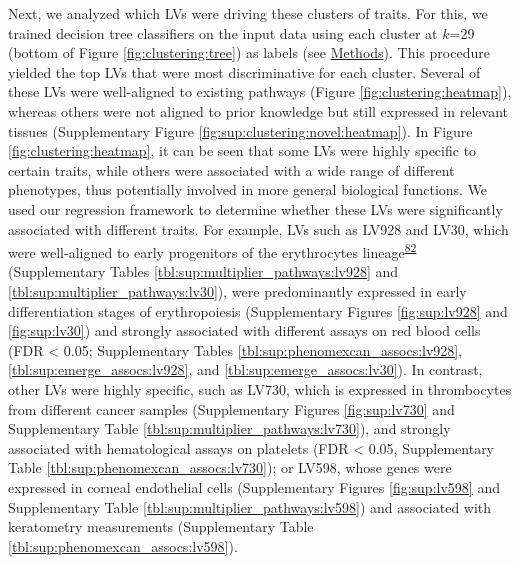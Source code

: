 \documentclass[
  a4paper,
]{article}
\begin{document}
Next, we analyzed which LVs were driving these clusters of traits.
For this, we trained decision tree classifiers on the input data using each cluster at \(k\)=29 (bottom of Figure \ref{fig:clustering:tree}) as labels (see \protect\hyperlink{sec:methods:clustering}{Methods}).
This procedure yielded the top LVs that were most discriminative for each cluster.
Several of these LVs were well-aligned to existing pathways (Figure \ref{fig:clustering:heatmap}), whereas others were not aligned to prior knowledge but still expressed in relevant tissues (Supplementary Figure \ref{fig:sup:clustering:novel:heatmap}).
In Figure \ref{fig:clustering:heatmap}, it can be seen that some LVs were highly specific to certain traits, while others were associated with a wide range of different phenotypes, thus potentially involved in more general biological functions.
We used our regression framework to determine whether these LVs were significantly associated with different traits.
For example, LVs such as LV928 and LV30, which were well-aligned to early progenitors of the erythrocytes lineage\textsuperscript{\protect\hyperlink{ref-Zk82GvJV}{82}} (Supplementary Tables \ref{tbl:sup:multiplier_pathways:lv928} and \ref{tbl:sup:multiplier_pathways:lv30}), were predominantly expressed in early differentiation stages of erythropoiesis (Supplementary Figures \ref{fig:sup:lv928} and \ref{fig:sup:lv30}) and strongly associated with different assays on red blood cells (FDR \textless{} 0.05; Supplementary Tables \ref{tbl:sup:phenomexcan_assocs:lv928}, \ref{tbl:sup:emerge_assocs:lv928}, and \ref{tbl:sup:emerge_assocs:lv30}).
In contrast, other LVs were highly specific, such as LV730, which is expressed in thrombocytes from different cancer samples (Supplementary Figures \ref{fig:sup:lv730} and Supplementary Table \ref{tbl:sup:multiplier_pathways:lv730}), and strongly associated with hematological assays on platelets (FDR \textless{} 0.05, Supplementary Table \ref{tbl:sup:phenomexcan_assocs:lv730});
or LV598, whose genes were expressed in corneal endothelial cells (Supplementary Figures \ref{fig:sup:lv598} and Supplementary Table \ref{tbl:sup:multiplier_pathways:lv598}) and associated with keratometry measurements (Supplementary Table \ref{tbl:sup:phenomexcan_assocs:lv598}).
\end{document}
